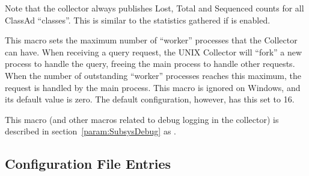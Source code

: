 \begin{description}
  Note that the collector always publishes Lost, Total and Sequenced
  counts for all ClassAd ``classes''.  This is similar to the
  statistics gathered if  is enabled.

 \item[\Macro{COLLECTOR\_QUERY\_WORKERS}]
  \label{param:CollectorQueryWorkers} This macro sets the maximum
  number of ``worker'' processes that the Collector can have.  When
  receiving a query request, the UNIX Collector will ``fork'' a new
  process to handle the query, freeing the main process to handle
  other requests.  When the number of outstanding ``worker'' processes
  reaches this maximum, the request is handled by the main process.
  This macro is ignored on Windows, and its default value is zero.
  The default configuration, however, has this set to 16.

\item[\Macro{COLLECTOR\_DEBUG}] \label{param:CollectorDebug} This
  macro (and other macros related to debug logging in the collector)
  is described in section~\ref{param:SubsysDebug} as
  .

\end{description}

\subsection{\label{sec:Negotiator-Config-File-Entries}
Configuration File Entries}

